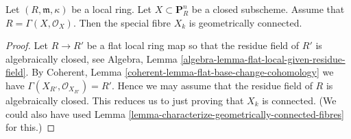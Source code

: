 \begin{lemma}
\label{lemma-stein-projective}
Let $(R, \mathfrak m, \kappa)$ be a local ring.
Let $X \subset \mathbf{P}^n_R$ be a closed subscheme.
Assume that $R = \Gamma(X, \mathcal{O}_X)$. Then the special fibre
$X_k$ is geometrically connected.
\end{lemma}

\begin{proof}
Let $R \to R'$ be a flat local ring map so that the residue field of
$R'$ is algebraically closed, see
Algebra, Lemma \ref{algebra-lemma-flat-local-given-residue-field}.
By Coherent, Lemma \ref{coherent-lemma-flat-base-change-cohomology}
we have
$\Gamma(X_{R'}, \mathcal{O}_{X_{R'}}) = R'$.
Hence we may assume that the residue field of $R$ is algebraically
closed. This reduces us to just proving that $X_k$ is connected.
(We could also have used
Lemma \ref{lemma-characterize-geometrically-connected-fibres} for this.)


\end{proof}
